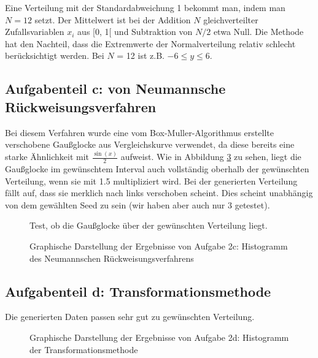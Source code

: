 Eine Verteilung mit der Standardabweichung 1 bekommt man, indem man $N = 12$ setzt. Der Mittelwert ist bei der Addition $N$ gleichverteilter Zufallsvariablen $x_i$ aus [0, 1[ und Subtraktion von $N/2$ etwa Null. Die Methode hat den Nachteil, dass die Extremwerte der Normalverteilung relativ schlecht berücksichtigt werden. Bei $N$ = 12 ist z.B. $-6 \leq y \leq 6$.

\subsection*{Aufgabenteil c: von Neumannsche Rückweisungsverfahren}
Bei diesem Verfahren wurde eine vom Box-Muller-Algorithmus erstellte verschobene Gaußglocke aus Vergleichskurve verwendet, da diese bereits eine starke Ähnlichkeit mit $\frac{\sin(x)}{2}$ aufweist.
Wie in Abbildung \ref{fig:2ctest} zu sehen, liegt die Gaußglocke im gewünschtem Interval auch vollständig oberhalb der gewünschten Verteilung, wenn sie mit 1.5 multipliziert wird.
Bei der generierten Verteilung fällt auf, dass sie merklich nach links verschoben scheint.
Dies scheint unabhängig von dem gewählten Seed zu sein (wir haben aber auch nur 3 getestet).

\begin{landscape}
	\begin{figure}
		\caption{Test, ob die Gaußglocke über der gewünschten Verteilung liegt.}
		\label{fig:2ctest}
	\end{figure}
\end{landscape}

\begin{landscape}
	\begin{figure}
		\caption{Graphische Darstellung der Ergebnisse von Aufgabe 2c: Histogramm des Neumannschen Rückweisungsverfahrens}
		\label{fig:2c}
	\end{figure}
\end{landscape}

\subsection*{Aufgabenteil d: Transformationsmethode}
Die generierten Daten passen sehr gut zu gewünschten Verteilung.

\begin{landscape}
	\begin{figure}
		\caption{Graphische Darstellung der Ergebnisse von Aufgabe 2d: Histogramm der Transformationsmethode}
		\label{fig:2ctest}
	\end{figure}
\end{landscape}



